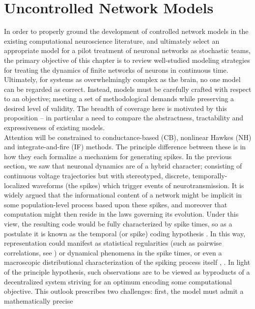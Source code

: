 \documentclass[12pt, oneside]{report}
\newcommand{\1}[1]{\mathbbm{1}_{\{#1\}}}
\theoremstyle{definition}
\begin{document}
\chapter{Uncontrolled Network Models}\label{chap1}
In order to properly ground the development of controlled network models in the
existing computational neuroscience literature, and ultimately select an
appropriate model for a pilot treatment of neuronal networks as stochastic
teams, the primary objective of this chapter is to review well-studied modeling
strategies for treating the dynamics of finite networks of neurons in continuous
time. Ultimately, for systems as overwhelmingly complex as the brain, no one model
can be regarded as correct. Instead, models must be carefully crafted with respect
to an objective; meeting a set of methodological demands while preserving a
desired level of validity. The breadth of coverage here is motivated by this
proposition -- in particular a need to compare the abstractness, tractability
and expressiveness of existing models.\\[5pt]
\indent Attention will be constrained to conductance-based (CB), nonlinear
Hawkes (NH) and integrate-and-fire (IF) methods. The principle
difference between these is in how they each formalize a mechanism for
generating spikes. In the previous section, we saw that neuronal dynamics are of a hybrid
character; consisting of continuous voltage trajectories but with stereotyped,
discrete, temporally-localized waveforms (the spikes) which trigger events of
neurotransmission. It is widely argued that the informational content of a
network might be implicit in some population-level process based upon these
spikes, and moreover that computation might then reside in the laws governing
its evolution. Under this view, the resulting code would be fully characterized
by spike times, so as a postulate it is known as the temporal (or spike) coding
hypothesis \cite{Brette_2015}. In this way, representation could manifest as
statistical regularities (such as pairwise correlations, see \cite{Marre_El_Boustani_Frégnac_Destexhe_2009})
or dynamical phenomena \cite{Lisman_Buzsaki_2008} in the spike times, or even a
macroscopic distributional characterization of the spiking process itself
\cite{Buesing_Bill_Nessler_Maass_2011}, \cite{Habenschuss_Jonke_Maass_2013}. In light of the principle hypothesis, such
observations are to be viewed as byproducts of a decentralized system striving
for an optimum encoding some computational objective. This outlook 
prescribes two challenges: first, the model must admit a mathematically precise
\end{document}
